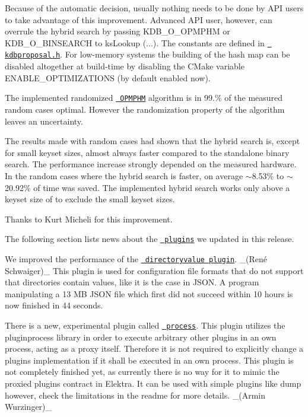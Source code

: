 Because of the automatic decision, usually nothing needs to be done by A\+PI users to take advantage of this improvement. Advanced A\+PI user, however, can overrule the hybrid search by passing {\ttfamily K\+D\+B\+\_\+\+O\+\_\+\+O\+P\+M\+P\+HM} or {\ttfamily K\+D\+B\+\_\+\+O\+\_\+\+B\+I\+N\+S\+E\+A\+R\+CH} to {\ttfamily ks\+Lookup (...)}. The constants are defined in \href{https://master.libelektra.org/src/include/kdbproposal.h}{\texttt{ kdbproposal.\+h}}. For low-\/memory systems the building of the hash map can be disabled altogether at build-\/time by disabling the C\+Make variable {\ttfamily E\+N\+A\+B\+L\+E\+\_\+\+O\+P\+T\+I\+M\+I\+Z\+A\+T\+I\+O\+NS} (by default enabled now).

The implemented randomized \href{https://master.libelektra.org/doc/dev/data-structures.md\#order-preserving-minimal-perfect-hash-map-aka-opmphm}{\texttt{ O\+P\+M\+P\+HM}} algorithm is in 99.\% of the measured random cases optimal. However the randomization property of the algorithm leaves an uncertainty.

The results made with random cases had shown that the hybrid search is, except for small keyset sizes, almost always faster compared to the standalone binary search. The performance increase strongly depended on the measured hardware. In the random cases where the hybrid search is faster, on average $\sim$8.53\% to $\sim$20.92\% of time was saved. The implemented hybrid search works only above a keyset size of {} to exclude the small keyset sizes.

Thanks to Kurt Micheli for this improvement.

The following section lists news about the \href{https://www.libelektra.org/plugins/readme}{\texttt{ plugins}} we updated in this release.

We improved the performance of the \href{https://libelektra.org/plugins/directoryvalue}{\texttt{ directoryvalue plugin}}. \+\_\+(René Schwaiger)\+\_\+ This plugin is used for configuration file formats that do not support that directories contain values, like it is the case in J\+S\+ON. A program manipulating a 13 MB J\+S\+ON file which first did not succeed within 10 hours is now finished in 44 seconds.

There is a new, experimental plugin called \href{https://libelektra.org/plugins/process}{\texttt{ process}}. This plugin utilizes the pluginprocess library in order to execute arbitrary other plugins in an own process, acting as a proxy itself. Therefore it is not required to explicitly change a plugin\textquotesingle{}s implementation if it shall be executed in an own process. This plugin is not completely finished yet, as currently there is no way for it to mimic the proxied plugin\textquotesingle{}s contract in Elektra. It can be used with simple plugins like {\ttfamily dump} however, check the limitations in the readme for more details. \+\_\+(\+Armin Wurzinger)\+\_\+

